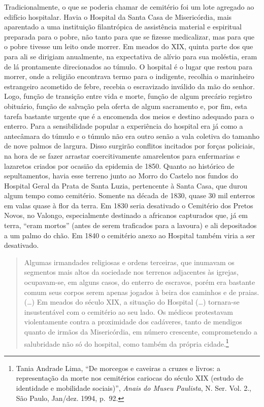 Tradicionalmente, o que se poderia chamar de cemitério foi um lote
agregado ao edifício hospitalar. Havia o Hospital da Santa Casa de
Misericórdia, mais aparentado a uma instituição filantrópica de
assistência material e espiritual preparada para o pobre, não tanto para
que se fizesse medicalizar, mas para que o pobre tivesse um leito onde
morrer. Em meados do XIX, quinta parte dos que para ali se dirigiam
anualmente, na expectativa de alívio para sua moléstia, eram de lá
prontamente direcionados ao túmulo. O hospital é o lugar que restou para
morrer, onde a religião encontrava termo para o indigente, recolhia o
marinheiro estrangeiro acometido de febre, recebia o escravizado
inválido da mão do senhor. Logo, função de transição entre vida e morte,
função de algum precário registro obituário, função de salvação pela
oferta de algum sacramento e, por fim, esta tarefa bastante urgente que
é a encomenda dos meios e destino adequado para o enterro. Para a
sensibilidade popular a experiência do hospital era já como a antecâmara
do túmulo e o túmulo não era outro senão a vala coletiva do tamanho de
nove palmos de largura. Disso surgirão conflitos incitados por forças
policiais, na hora de se fazer arrastar coercitivamente amarelentos para
enfermarias e lazaretos criados por ocasião da epidemia de 1850. Quanto
ao histórico de sepultamentos, havia esse terreno junto ao Morro do
Castelo nos fundos do Hospital Geral da Prata de Santa Luzia,
pertencente à Santa Casa, que durou algum tempo como cemitério. Somente
na década de 1830, quase 30 mil enterros em valas quase à flor da terra.
Em 1830 seria desativado o Cemitério dos Pretos Novos, no Valongo,
especialmente destinado a africanos capturados que, já em terra, ``eram
mortos'' (antes de serem traficados para a lavoura) e ali depositados a
um palmo do chão. Em 1840 o cemitério anexo ao Hospital também viria a
ser desativado.

\begin{quote}
Algumas irmandades religiosas e ordens terceiras, que inumavam os
segmentos mais altos da sociedade nos terrenos adjacentes às igrejas,
ocupavam-se, em alguns casos, do enterro de escravos, porém era bastante
comum seus corpos serem apenas jogados à beira dos caminhos e de praias.
(\ldots{}) Em meados do século XIX, a situação do Hospital (\ldots{})
tornara-se insustentável com o cemitério ao seu lado. Os médicos
protestavam violentamente contra a proximidade dos cadáveres, tanto de
mendigos quanto de irmãos da Misericórdia, em número crescente,
comprometendo a salubridade não só do hospital, como também da própria
cidade.\footnote{Tania Andrade Lima, ``De morcegos e caveiras a cruzes e
  livros: a representação da morte nos cemitérios cariocas do século XIX
  (estudo de identidade e mobilidade sociais)'', \emph{Anais do Museu
  Paulista}, N. Ser. Vol. 2., São Paulo, Jan/dez. 1994, p.~92.}
\end{quote}

